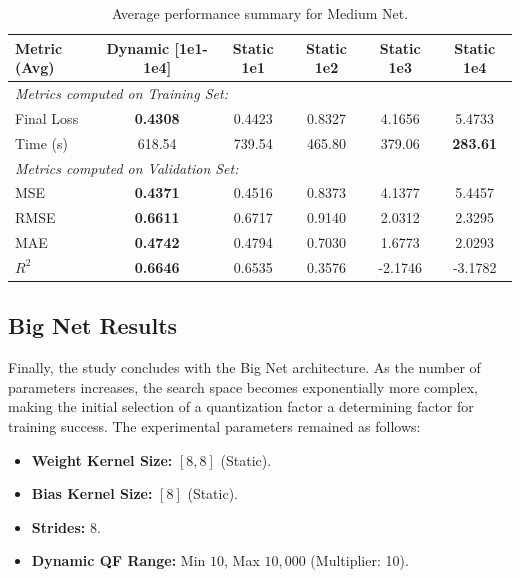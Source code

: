 \begin{table}[h]
\centering
\scriptsize
\begin{tabular}{|l|c|c|c|c|c|}
\hline
\textbf{Metric (Avg)} & \textbf{Dynamic [1e1-1e4]} & \textbf{Static 1e1} & \textbf{Static 1e2} & \textbf{Static 1e3} & \textbf{Static 1e4} \\ \hline
\multicolumn{6}{|l|}{\textit{Metrics computed on Training Set:}} \\ \hline
Final Loss            & \textbf{0.4308}            & 0.4423               & 0.8327               & 4.1656               & 5.4733               \\ \hline
Time (s)              & 618.54            & 739.54               & 465.80               & 379.06               & \textbf{283.61}               \\ \hline
\multicolumn{6}{|l|}{\textit{Metrics computed on Validation Set:}} \\ \hline
MSE                   & \textbf{0.4371}            & 0.4516               & 0.8373               & 4.1377               & 5.4457               \\ \hline
RMSE                  & \textbf{0.6611}            & 0.6717               & 0.9140               & 2.0312               & 2.3295               \\ \hline
MAE                   & \textbf{0.4742}            & 0.4794               & 0.7030               & 1.6773               & 2.0293               \\ \hline
$R^2$                 & \textbf{0.6646}            & 0.6535               & 0.3576               & -2.1746              & -3.1782              \\ \hline
\end{tabular}
\caption{Average performance summary for Medium Net.}
\label{tab:medium_net_quant_results}
\end{table}

\newpage

\subsection{Big Net Results}

Finally, the study concludes with the Big Net architecture. As the number of parameters increases, the search space becomes exponentially more complex, making the initial selection of a quantization factor a determining factor for training success. The experimental parameters remained as follows:

\begin{itemize}
    \item \textbf{Weight Kernel Size:} $[8,8]$ (Static).
    \item \textbf{Bias Kernel Size:} $[8]$ (Static).
    \item \textbf{Strides:} 8.
    \item \textbf{Dynamic QF Range:} Min $10$, Max $10,000$ (Multiplier: 10).
\end{itemize}


